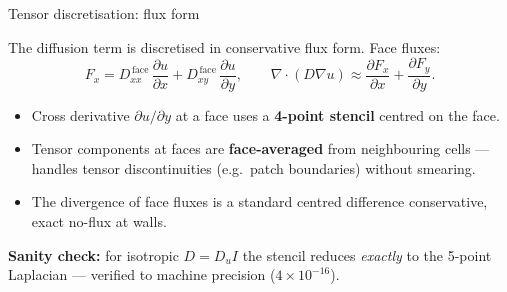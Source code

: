 \documentclass[aspectratio=169,11pt]{beamer}
\begin{document}
\begin{frame}{Tensor discretisation: flux form}

The diffusion term is discretised in conservative flux form. Face fluxes:
\[
    F_x = D_{xx}^{\,\text{face}}\, \frac{\partial u}{\partial x}
        + D_{xy}^{\,\text{face}}\, \frac{\partial u}{\partial y},
    \qquad
    \nabla \cdot (D \nabla u) \approx \frac{\partial F_x}{\partial x} + \frac{\partial F_y}{\partial y}.
\]

\vspace{0.2cm}
\begin{itemize}
    \item Cross derivative $\partial u / \partial y$ at a face uses a \textbf{4-point stencil} centred on the face.
    \item Tensor components at faces are \textbf{face-averaged} from neighbouring cells --- handles tensor discontinuities (e.g.\ patch boundaries) without smearing.
    \item The divergence of face fluxes is a standard centred difference \textrightarrow{} conservative, exact no-flux at walls.
\end{itemize}

\vspace{0.3cm}
\textbf{Sanity check:} for isotropic $D = D_u I$ the stencil reduces \emph{exactly} to the 5-point Laplacian --- verified to machine precision ($4 \times 10^{-16}$).

\end{frame}
\end{document}
